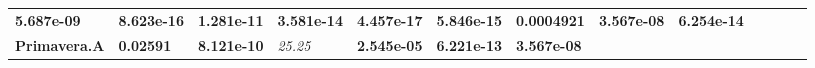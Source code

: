 \documentclass[]{book}
\theoremstyle{definition}
\theoremstyle{definition}
\theoremstyle{definition}
\theoremstyle{remark}
\begin{document}
\begin{longtable}[]{@{}lllllllllllll@{}}
\begin{minipage}[t]{0.05\columnwidth}
\textbf{5.687e-09}\strut
\end{minipage} & \begin{minipage}[t]{0.05\columnwidth}\raggedright
\textbf{8.623e-16}\strut
\end{minipage} & \begin{minipage}[t]{0.05\columnwidth}\raggedright
\textbf{1.281e-11}\strut
\end{minipage} & \begin{minipage}[t]{0.06\columnwidth}\raggedright
\textbf{3.581e-14}\strut
\end{minipage} & \begin{minipage}[t]{0.05\columnwidth}\raggedright
\textbf{4.457e-17}\strut
\end{minipage} & \begin{minipage}[t]{0.05\columnwidth}\raggedright
\textbf{5.846e-15}\strut
\end{minipage} & \begin{minipage}[t]{0.05\columnwidth}\raggedright
\textbf{0.0004921}\strut
\end{minipage} & \begin{minipage}[t]{0.06\columnwidth}\raggedright
\textbf{3.567e-08}\strut
\end{minipage} & \begin{minipage}[t]{0.05\columnwidth}\raggedright
\textbf{6.254e-14}\strut
\end{minipage}\tabularnewline
\begin{minipage}[t]{0.06\columnwidth}\raggedright
\textbf{Primavera.A}\strut
\end{minipage} & \begin{minipage}[t]{0.05\columnwidth}\raggedright
\textbf{0.02591}\strut
\end{minipage} & \begin{minipage}[t]{0.05\columnwidth}\raggedright
\textbf{8.121e-10}\strut
\end{minipage} & \begin{minipage}[t]{0.06\columnwidth}\raggedright
\emph{25.25}\strut
\end{minipage} & \begin{minipage}[t]{0.05\columnwidth}\raggedright
\textbf{2.545e-05}\strut
\end{minipage} & \begin{minipage}[t]{0.05\columnwidth}\raggedright
\textbf{6.221e-13}\strut
\end{minipage} & \begin{minipage}[t]{0.05\columnwidth}\raggedright
\textbf{3.567e-08}\strut

\end{minipage}
\end{longtable}
\end{document}
